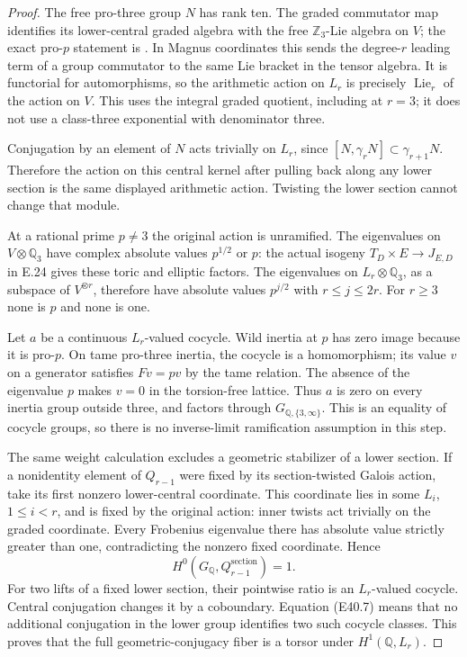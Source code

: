 \begin{proof}
The free pro-three group $N$ has rank ten. The graded
commutator map identifies its lower-central graded
algebra with the free $\mathbb Z_3$-Lie algebra on $V$;
the exact pro-$p$ statement is
\cite[Theorem 2.1, pp.~4--5]{E_KochKukkukLabute}.
In Magnus coordinates this sends the degree-$r$
leading term of a group commutator to the same Lie
bracket in the tensor algebra. It is functorial for
automorphisms, so the arithmetic action on $L_r$ is
precisely $\operatorname{Lie}_r$ of the action on $V$.
This uses the integral graded quotient, including at
$r=3$; it does not use a class-three exponential with
denominator three.

Conjugation by an element of $N$ acts trivially on
$L_r$, since $[N,\gamma_rN]\subset\gamma_{r+1}N$.
Therefore the action on this central kernel after
pulling back along any lower section is the same
displayed arithmetic action. Twisting the lower
section cannot change that module.

At a rational prime $p\ne3$ the original action is
unramified. The eigenvalues on $V\otimes\mathbb Q_3$
have complex absolute values $p^{1/2}$ or $p$:
the actual isogeny $T_D\times E\to J_{E,D}$ in E.24
gives these toric and elliptic factors. The eigenvalues
on $L_r\otimes\mathbb Q_3$, as a subspace of
$V^{\otimes r}$, therefore have absolute values
$p^{j/2}$ with $r\le j\le2r$. For $r\ge3$ none is
$p$ and none is one.

Let $a$ be a continuous $L_r$-valued cocycle. Wild
inertia at $p$ has zero image because it is pro-$p$.
On tame pro-three inertia, the cocycle is a
homomorphism; its value $v$ on a generator satisfies
$Fv=pv$ by the tame relation. The absence of the
eigenvalue $p$ makes $v=0$ in the torsion-free lattice.
Thus $a$ is zero on every inertia group outside
three, and factors through $G_{\mathbb Q,\{3,\infty\}}$.
This is an equality of cocycle groups, so there is no
inverse-limit ramification assumption in this step.

The same weight calculation excludes a geometric
stabilizer of a lower section. If a nonidentity
element of $Q_{r-1}$ were fixed by its section-twisted
Galois action, take its first nonzero lower-central
coordinate. This coordinate lies in some
$L_i$, $1\le i<r$, and is fixed by the original action:
inner twists act trivially on the graded coordinate.
Every Frobenius eigenvalue there has absolute value
strictly greater than one, contradicting the nonzero
fixed coordinate. Hence
\[
 H^0(G_{\mathbb Q},Q_{r-1}^{\mathrm{section}})=1.
 \tag{E40.7}
\]
For two lifts of a fixed lower section, their pointwise
ratio is an $L_r$-valued cocycle. Central conjugation
changes it by a coboundary. Equation (E40.7) means
that no additional conjugation in the lower group
identifies two such cocycle classes. This proves that
the full geometric-conjugacy fiber is a torsor under
$H^1(\mathbb Q,L_r)$.


\end{proof}
